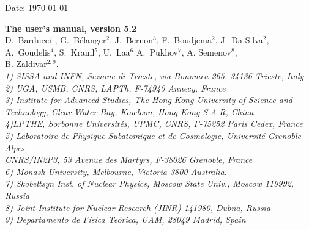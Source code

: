 \documentclass[12pt,a4paper]{article}
\begin{document}
\def\micro{{\tt micrOMEGAs}}
\def\ra{\rightarrow}
\def\calchep{{\tt CalcHEP}}

\def\suspect{{\tt SuSpect}}
\def\mbmb{m_b(m_b)}
\def\mt{m_t}
\def\dMb{\Delta m_b}
\def\dMq{\Delta m_q}
\def\delrho{\Delta\rho}
\def\bsgamma{b\to s\gamma}
\def\bsmu{B_s\to \mu^+\mu^-}
\def\gmuon{(g-2)_\mu}
\def\noi{\noindent}
\def\VERSION{5.2}
\def\neuto{\tilde\chi^0_1}
\def\neuti{\tilde\chi^0_i}
\def\neutt{\tilde\chi^0_2}
\def\neuth{\tilde\chi^0_3}
\def\smodels{{\tt SModelS}}
\def\lilith{{\tt Lilith}}
\def\HB{{\tt HiggsBounds}}
\def\HS{{\tt HiggsSignals}}

\def\eg{{\it e.g.}}
\def\ie{{\it i.e.}}

\def\br{{\rm BR}}



\def\wimpsim{{\tt WimpSim}}
\def\pppc{{\tt }PPPC4DM$\nu$}
\newcommand{\gb}{\color{blue}}

\begin{flushright}
   \vspace*{-18mm}
   Date: \today
\end{flushright}
\vspace*{2mm}




\begin{center}


{\Large\bf The   user's manual, version \VERSION} \\[8mm]

{\large   D.~Barducci$^1$, G.~B\'elanger$^2$, J.~Bernon$^{3}$, F.~Boudjema$^2$, J.~Da Silva$^{2}$,\\[2mm] A.~Goudelis$^{4}$, S.~Kraml$^{5}$, U.~Laa$^{6}$
A.~Pukhov$^7$,  A. Semenov$^8$, \\[2mm]B. Zaldivar$^{2,9}$.}\\[4mm]

{\it 1) SISSA and INFN, Sezione di Trieste, via Bonomea 265, 34136 Trieste, Italy\\
2) UGA, USMB, CNRS, LAPTh,  F-74940 Annecy, France\\
3) Institute for Advanced Studies, The Hong Kong University of Science and Technology, Clear Water Bay, Kowloon, Hong Kong S.A.R, China\\
4){LPTHE}, Sorbonne Universit\'es, UPMC,  CNRS, F-75252 Paris Cedex, France\\
 5) {Laboratoire de Physique Subatomique et de Cosmologie}, Universit\'e Grenoble-Alpes,\\ CNRS/IN2P3, 53 Avenue des Martyrs, F-38026 Grenoble,  France\\
 6) Monash University, Melbourne, Victoria 3800 Australia.\\
     7) Skobeltsyn Inst. of Nuclear Physics, Moscow State Univ., Moscow 119992, Russia\\
     8) Joint Institute for Nuclear Research (JINR) 141980, Dubna,  Russia\\
      9) Departamento de F\'isica Te\'orica, UAM, 28049 Madrid, Spain \\}
\end{center}
\end{document}
